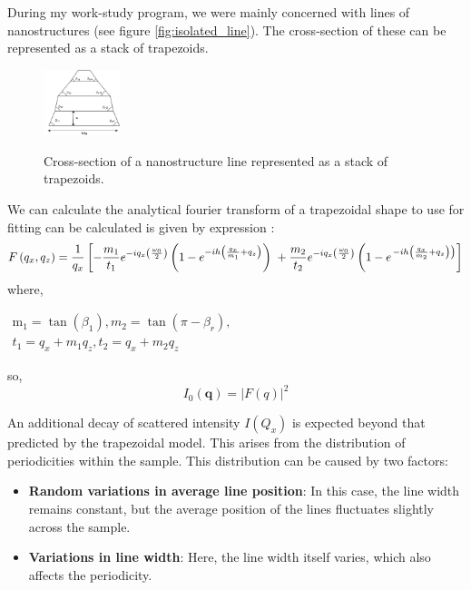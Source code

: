 During my work-study program, we were mainly concerned with lines of nanostructures (see figure \ref{fig:isolated_line}). The cross-section of
these can be represented as a stack of trapezoids.
\begin{figure}[h]
    \centering
    \includegraphics[width=0.2\textwidth]{images/trapezoid.png}
    \label{fig:trapezoid_model}
    \caption{Cross-section of a nanostructure line represented as a stack of trapezoids.}
    
\end{figure}
We can calculate the analytical fourier transform of a trapezoidal shape to use for fitting
can be calculated is given by expression \cite{sunday_2015}:
\begin{equation}
    F\left(q_{x}, q_{z}\right)=\frac{1}{q_{x}}\left[-\frac{m_{1}}{t_{1}} e^{-i q_{x}\left(\frac{\omega_{0}}{2}\right)}\left(1-e^{-i h\left(\frac{q_{x}}{m_{1}}+q_{z}\right)}\right)\right. \\ +\frac{m_{2}}{t_{2}} e^{-i q_{x}\left(\frac{\omega_{0}}{2}\right)}\left(1-e^{\left.-i h\left(\frac{q_{x}}{m_{2}}+q_{z}\right)\right)}\right]
    \label{eq:trapezoidal_ft}
\end{equation}
where,

\( \begin{array}{l}\mathrm{m}_{1}=\tan \left(\beta_{1}\right) , m_{2}=\tan \left(\pi-\beta_{r}\right), \\ t_{1}= q_{x}+m_{1} q_{z}, t_{2}= q_{x}+m_{2} q_{z}\end{array} \)

\medskip

so,
\begin{equation}
    I_{0}(\mathbf{q}) = |F(q)|^{2}
\end{equation}

An additional decay of scattered intensity $I(Q_{x})$ is expected beyond that predicted by the trapezoidal model.
This arises from the distribution of periodicities within the sample. This distribution 
can be caused by two factors:
\begin{itemize}
    \item \textbf{Random variations in average line position}: In this case, the line width remains
         constant, but the average position of the lines fluctuates slightly across the 
         sample.
    \item \textbf{Variations in line width}: Here, the line width itself varies, 
        which also affects the periodicity.
\end{itemize}

